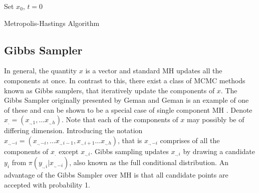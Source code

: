 	\begin{algorithm}[H]
	\label{alg:MetHast}
 Set $x_0$, $t=0$\; 


 \caption{Metropolis-Hastings Algorithm}
\end{algorithm}

\subsection{Gibbs Sampler}
In general, the quantity $x$ is a vector and standard MH updates all the components at once. In contrast to this, there exist a class of MCMC methods known as Gibbs samplers, that iteratively update the components of $x$. The Gibbs Sampler originally presented by  Geman and Geman \cite{geman1984stochastic} is an example of one of these and can be shown to be a special case of single component MH \cite{gilks1995markov}. 
Denote $x_. = (x_{.,1},\ldots x_{.,h})$. Note that each of the components of $x$ may possibly be of differing dimension. 
Introducing the notation $x_{.,-i} = (x_{.,-i},\ldots x_{.,i-1}, x_{.,i+1} \ldots x_{.,h})$, that is $x_{.,-i}$ comprises of all the components of $x_.$ except $x_{.,i}$. Gibbs sampling updates $x_{.,i}$ by drawing a candidate $y_i$ from $\pi(y_{.,i}|x_{.,-i})$, also known as the full conditional distribution. An advantage of the Gibbs Sampler over MH is that all candidate points are accepted with probability 1.

